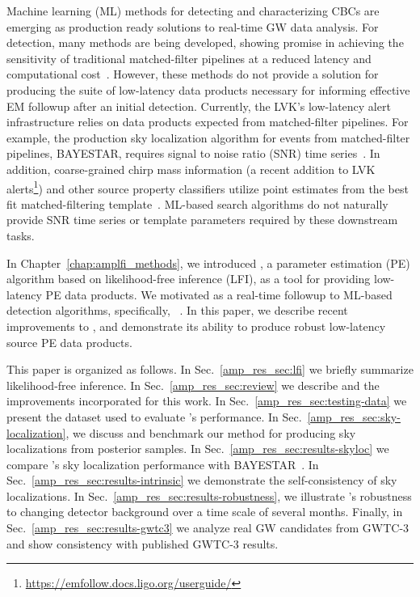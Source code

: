 \begin{refsection}
Machine learning (ML) methods for detecting and characterizing CBCs are emerging as production ready solutions to real-time GW data analysis. 
For detection, many methods are being developed, showing promise in achieving the sensitivity of traditional matched-filter pipelines at a reduced latency and computational cost~\cite{aframe-methods, sage, nousi2022deep}. 
However, these methods do not provide a solution for producing the suite of low-latency data products necessary for informing effective EM followup after an initial detection. 
Currently, the LVK's low-latency alert infrastructure relies on data products expected from matched-filter pipelines. 
For example, the production sky localization algorithm for events from matched-filter pipelines, BAYESTAR, requires signal to noise ratio (SNR) time series~\cite{Singer_2016}. 
In addition, coarse-grained chirp mass information (a recent addition to LVK alerts\footnote{\url{https://emfollow.docs.ligo.org/userguide/}}) and other source property classifiers utilize point estimates from the best fit matched-filtering template~\cite{Chatterjee:2019avs}. 
ML-based search algorithms do not naturally provide SNR time series or template parameters required by these downstream tasks. 

In Chapter~\ref{chap:amplfi_methods}, we introduced \amplfi, a parameter estimation (PE) algorithm based on likelihood-free inference (LFI), as a tool for providing low-latency PE data products.
We motivated \amplfi as a real-time followup to ML-based detection algorithms, specifically, \aframe~\cite{aframe-methods}.
In this paper, we describe recent improvements to \amplfi, and demonstrate its ability to produce robust low-latency source PE data products. 

This paper is organized as follows. 
In Sec.~\ref{amp_res_sec:lfi} we briefly summarize likelihood-free inference.
In Sec.~\ref{amp_res_sec:review} we describe \amplfi and the improvements incorporated for this work. 
In Sec.~\ref{amp_res_sec:testing-data} we present the dataset used to evaluate \amplfi's performance. 
In Sec.~\ref{amp_res_sec:sky-localization}, we discuss and benchmark our method for producing sky localizations from \amplfi posterior samples. 
In Sec.~\ref{amp_res_sec:results-skyloc} we compare \amplfi's sky localization performance with BAYESTAR~\cite{Singer_2016}. 
In Sec.~\ref{amp_res_sec:results-intrinsic} we demonstrate the self-consistency of \amplfi sky localizations. 
In Sec.~\ref{amp_res_sec:results-robustness}, we illustrate \amplfi's robustness to changing detector background over a time scale of several months. 
Finally, in Sec.~\ref{amp_res_sec:results-gwtc3} we analyze real GW candidates from GWTC-3 and show consistency with published GWTC-3 results. 




\end{refsection}
